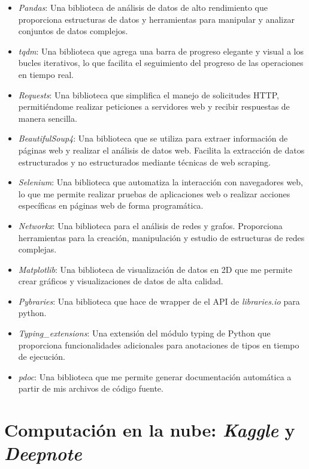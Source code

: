 \begin{itemize}
  \item \textit{Pandas}: Una biblioteca de análisis de datos de alto rendimiento que proporciona 
  estructuras de datos y herramientas para manipular y analizar conjuntos de datos complejos.
  \item \textit{tqdm}: Una biblioteca que agrega una barra de progreso elegante y visual a los 
  bucles iterativos, lo que facilita el seguimiento del progreso de las operaciones en tiempo real.
  \item \textit{Requests}: Una biblioteca que simplifica el manejo de solicitudes HTTP, 
  permitiéndome realizar peticiones a servidores web y recibir respuestas de manera sencilla.
  \item \textit{BeautifulSoup4}: Una biblioteca que se utiliza para extraer información de páginas web 
  y realizar el análisis de datos web. Facilita la extracción de datos estructurados y no estructurados 
  mediante técnicas de web scraping.
  \item \textit{Selenium}: Una biblioteca que automatiza la interacción con navegadores web, lo que 
  me permite realizar pruebas de aplicaciones web o realizar acciones específicas en páginas web de 
  forma programática.
  \item \textit{Networkx}: Una biblioteca para el análisis de redes y grafos. Proporciona herramientas 
  para la creación, manipulación y estudio de estructuras de redes complejas.
  \item \textit{Matplotlib}: Una biblioteca de visualización de datos en 2D que me permite crear 
  gráficos y visualizaciones de datos de alta calidad.
  \item \textit{Pybraries}: Una biblioteca que hace de wrapper de el API de 
  \textit{libraries.io} para python.
  \item \textit{Typing\_extensions}: Una extensión del módulo typing de Python que proporciona 
  funcionalidades adicionales para anotaciones de tipos en tiempo de ejecución.
  \item \textit{pdoc}: Una biblioteca que me permite generar documentación automática a partir 
  de mis archivos de código fuente.
\end{itemize}

\section{Computación en la nube: \textit{Kaggle} y \textit{Deepnote}}

